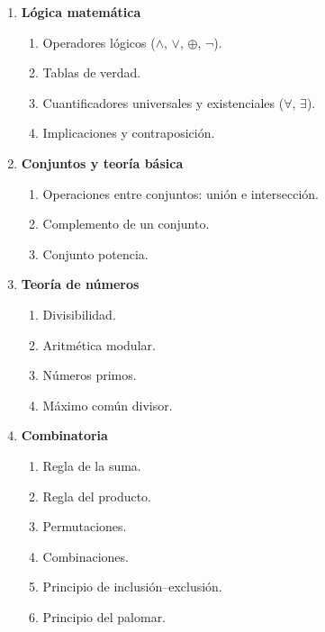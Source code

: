 \begin{enumerate}
  \item \textbf{Lógica matemática}

  \begin{enumerate}
    \item \label{itm:16.1} Operadores lógicos ($\land$, $\lor$, $\oplus$, $\lnot$).
    \item \label{itm:16.2} Tablas de verdad.
    \item \label{itm:16.3} Cuantificadores universales y existenciales ($\forall$, $\exists$).
    \item \label{itm:16.4} Implicaciones y contraposición.
  \end{enumerate}

  \item \textbf{Conjuntos y teoría básica}

  \begin{enumerate}
    \item \label{itm:17.1} Operaciones entre conjuntos: unión e intersección.
    \item \label{itm:17.2} Complemento de un conjunto.
    \item \label{itm:17.3} Conjunto potencia.
  \end{enumerate}

  \item \textbf{Teoría de números}

  \begin{enumerate}
    \item \label{itm:18.1} Divisibilidad.
    \item \label{itm:18.2} Aritmética modular.
    \item \label{itm:18.3} Números primos.
    \item \label{itm:18.4} Máximo común divisor.
  \end{enumerate}

  \item \textbf{Combinatoria}

  \begin{enumerate}
    \item \label{itm:19.1} Regla de la suma.
    \item \label{itm:19.2} Regla del producto.
    \item \label{itm:19.3} Permutaciones.
    \item \label{itm:19.4} Combinaciones.
    \item \label{itm:19.5} Principio de inclusión--exclusión.
    \item \label{itm:19.6} Principio del palomar.
  \end{enumerate}


\end{enumerate}
